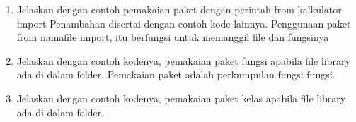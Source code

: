 \begin{enumerate}
\begin{itemize}
    \end{itemize}
    

    \item Jelaskan dengan contoh pemakaian paket dengan perintah from kalkulator 
    import Penambahan disertai dengan contoh kode lainnya.
    Penggunaan paket from namafile import, itu berfungsi untuk memanggil file dan fungsinya
    

    \item Jelaskan dengan contoh kodenya, pemakaian paket fungsi apabila file library
    ada di dalam folder.
    Pemakaian paket adalah perkumpulan fungsi fungsi. 
    \item Jelaskan dengan contoh kodenya, pemakaian paket kelas apabila file library ada di dalam folder.
	
\end{enumerate}
	
